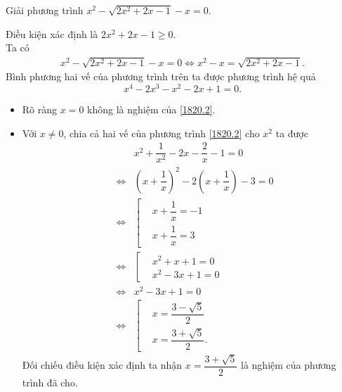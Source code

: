 \begin{ex}%
 Giải phương trình $x^2-\sqrt{2x^2+2x-1}-x=0$.
 \loigiai
  {
  Điều kiện xác định là $2x^2+2x-1 \geq 0$.\\
  Ta có
  \begin{eqnarray*}
   x^2-\sqrt{2x^2+2x-1}-x=0 \Leftrightarrow x^2-x=\sqrt{2x^2+2x-1}.
  \end{eqnarray*}
  Bình phương hai vế của phương trình trên ta được phương trình hệ quả
  \begin{equation}\label{1820.2}
   x^4-2x^3-x^2-2x+1=0.
  \end{equation}
  \begin{itemize}
   \item Rõ ràng $x=0$ không là nghiệm của \eqref{1820.2}.
   \item Với $x\neq 0$, chia cả hai vế của phương trình \eqref{1820.2} cho $x^2$ ta được
   \allowdisplaybreaks
   \begin{eqnarray*}
    && x^2+\dfrac{1}{x^2}-2x-\dfrac{2}{x}-1=0\\
    &\Leftrightarrow& \left(x+\dfrac{1}{x}\right)^2-2\left(x+\dfrac{1}{x}\right)-3=0\\
    &\Leftrightarrow& \left[\begin{aligned}&x+\dfrac{1}{x}=-1 \\&x+\dfrac{1}{x}=3 \end{aligned} \right.\\
    &\Leftrightarrow& \left[\begin{aligned}&x^2+x+1=0 \\&x^2-3x+1=0 \end{aligned} \right.\\
    &\Leftrightarrow& x^2-3x+1=0 \\
    &\Leftrightarrow& \left[\begin{aligned}&x=\dfrac{3-\sqrt{5}}{2} \\&x=\dfrac{3+\sqrt{5}}{2}. \end{aligned} \right.
   \end{eqnarray*}
   Đối chiếu điều kiện xác định ta nhận $x=\dfrac{3+\sqrt{5}}{2}$ là nghiệm của phương trình đã cho.
  \end{itemize}
  }
\end{ex}

